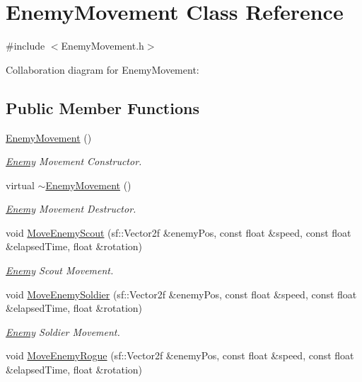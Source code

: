 \hypertarget{class_enemy_movement}{}\section{Enemy\+Movement Class Reference}
\label{class_enemy_movement}


{\ttfamily \#include $<$Enemy\+Movement.\+h$>$}



Collaboration diagram for Enemy\+Movement\+:
\subsection*{Public Member Functions}
\begin{DoxyCompactItemize}
\item 
\hyperlink{class_enemy_movement_ac6f13581112bc274a27105efa6cfc7d7}{Enemy\+Movement} ()
\begin{DoxyCompactList}\small\item\em \hyperlink{class_enemy}{Enemy} Movement Constructor. \end{DoxyCompactList}\item 
virtual \hyperlink{class_enemy_movement_ae99f4997a60564fcb672030c7b0d3be2}{$\sim$\+Enemy\+Movement} ()
\begin{DoxyCompactList}\small\item\em \hyperlink{class_enemy}{Enemy} Movement Destructor. \end{DoxyCompactList}\item 
void \hyperlink{class_enemy_movement_ac4b06df6242ceae2925ca689cef4cfba}{Move\+Enemy\+Scout} (sf\+::\+Vector2f \&enemy\+Pos, const float \&speed, const float \&elapsed\+Time, float \&rotation)
\begin{DoxyCompactList}\small\item\em \hyperlink{class_enemy}{Enemy} Scout Movement. \end{DoxyCompactList}\item 
void \hyperlink{class_enemy_movement_ae4f8dc0bcd83424c4d6ce76300bdf2c8}{Move\+Enemy\+Soldier} (sf\+::\+Vector2f \&enemy\+Pos, const float \&speed, const float \&elapsed\+Time, float \&rotation)
\begin{DoxyCompactList}\small\item\em \hyperlink{class_enemy}{Enemy} Soldier Movement. \end{DoxyCompactList}\item 
void \hyperlink{class_enemy_movement_a6e09641ef866d6a45c6ef342c905bc14}{Move\+Enemy\+Rogue} (sf\+::\+Vector2f \&enemy\+Pos, const float \&speed, const float \&elapsed\+Time, float \&rotation)

\end{DoxyCompactItemize}
